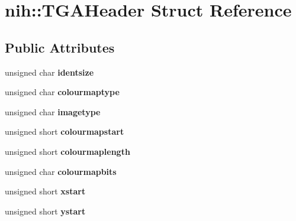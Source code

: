 \hypertarget{structnih_1_1_t_g_a_header}{
\section{nih\-:\-:\-T\-G\-A\-Header \-Struct \-Reference}
\label{structnih_1_1_t_g_a_header}
}
\subsection*{\-Public \-Attributes}
\begin{DoxyCompactItemize}
\item 
\hypertarget{structnih_1_1_t_g_a_header_af0d5cf3d5513d7ea27731598887ebc0b}{
unsigned char {\bfseries identsize}}
\label{structnih_1_1_t_g_a_header_af0d5cf3d5513d7ea27731598887ebc0b}

\item 
\hypertarget{structnih_1_1_t_g_a_header_abceb80f7739d1ade3dfc7e981bf8fb4e}{
unsigned char {\bfseries colourmaptype}}
\label{structnih_1_1_t_g_a_header_abceb80f7739d1ade3dfc7e981bf8fb4e}

\item 
\hypertarget{structnih_1_1_t_g_a_header_ae07a042b35ec7650b82dc0e67cc680fe}{
unsigned char {\bfseries imagetype}}
\label{structnih_1_1_t_g_a_header_ae07a042b35ec7650b82dc0e67cc680fe}

\item 
\hypertarget{structnih_1_1_t_g_a_header_aae85179e085a30d0894d84645c931f6f}{
unsigned short {\bfseries colourmapstart}}
\label{structnih_1_1_t_g_a_header_aae85179e085a30d0894d84645c931f6f}

\item 
\hypertarget{structnih_1_1_t_g_a_header_a889dabc0aecee4ba75d7a30a7e5f61f3}{
unsigned short {\bfseries colourmaplength}}
\label{structnih_1_1_t_g_a_header_a889dabc0aecee4ba75d7a30a7e5f61f3}

\item 
\hypertarget{structnih_1_1_t_g_a_header_a9f5964a2f857dd4d99bf0748804c3cbd}{
unsigned char {\bfseries colourmapbits}}
\label{structnih_1_1_t_g_a_header_a9f5964a2f857dd4d99bf0748804c3cbd}

\item 
\hypertarget{structnih_1_1_t_g_a_header_aa2f689c65b13a81d2a30d4f6719e6de3}{
unsigned short {\bfseries xstart}}
\label{structnih_1_1_t_g_a_header_aa2f689c65b13a81d2a30d4f6719e6de3}

\item 
\hypertarget{structnih_1_1_t_g_a_header_a15fbd8cb78d6e9b21bd3979ce4160e7b}{
unsigned short {\bfseries ystart}}
\label{structnih_1_1_t_g_a_header_a15fbd8cb78d6e9b21bd3979ce4160e7b}


\end{DoxyCompactItemize}
